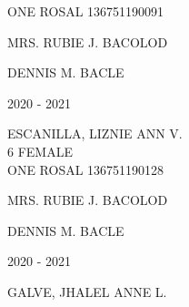 \documentclass{article}
\begin{document}
{{\begin{multicols}{2}
\phantom{Grade} \hspace*{3em} ONE \phantom{Section} \hspace*{4em} ROSAL \phantom{LRN} \hspace*{4em} 136751190091 \\
\vspace*{25mm}
\begin{flushright}
MRS. RUBIE J. BACOLOD \hspace*{-1.5em}
\end{flushright}  
\vspace*{1.5mm}
\hspace*{3em} DENNIS M. BACLE
\end{multicols} 
\newpage
\begin{multicols}{2}
\phantom{u}
\columnbreak
\vspace*{-3mm}
\begin{center}
\phantom{school year:} \hspace*{6em} 2020 - 2021 
\end{center} 
\vspace{4mm} 
\phantom{Name:} \hspace*{5em} ESCANILLA, LIZNIE ANN V. \\[2.5mm] %
\phantom{Age} \hspace*{8em} 6  \phantom{Sex} \hspace*{12em} FEMALE \\[2.5mm] %
\phantom{Grade} \hspace*{3em} ONE \phantom{Section} \hspace*{4em} ROSAL \phantom{LRN} \hspace*{4em} 136751190128 \\
\vspace*{25mm}
\begin{flushright}
MRS. RUBIE J. BACOLOD \hspace*{-1.5em}
\end{flushright}  
\vspace*{1.5mm}
\hspace*{3em} DENNIS M. BACLE
\end{multicols} 
\newpage
\begin{multicols}{2}
\phantom{u}
\columnbreak
\vspace*{-3mm}
\begin{center}
\phantom{school year:} \hspace*{6em} 2020 - 2021 
\end{center} 
\vspace{4mm} 
\phantom{Name:} \hspace*{5em} GALVE, JHALEL ANNE L. \\[2.5mm] %

\end{multicols}}}
\end{document}
